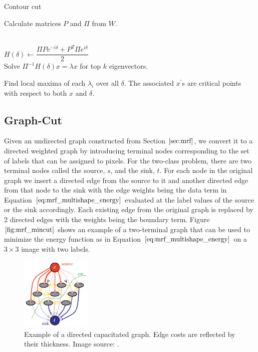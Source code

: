 \documentclass{SMBV12}
\begin{document}
\begin{algorithm}
\caption{Contour cut}
Calculate matrices $P$ and $\Pi$ from $W$.
\begin{algorithmic}
\\
\qquad $H(\delta) \leftarrow \dfrac{\Pi P e^{-i\delta} + P^T \Pi e^{i\delta}}{2}$\\
\qquad Solve $\Pi^{-1} H(\delta)x = \lambda x$ for top $k$ eigenvectors.
\EndFor
\end{algorithmic}
Find local maxima of each $\lambda_i$ over all $\delta$. The associated $x^\prime$s are critical points with respect to both $x$ and $\delta$.
\end{algorithm}

\subsection{Graph-Cut}
\label{sec:graph_cut}
Given an undirected graph constructed from Section $\ref{sec:mrf}$, we convert it to a directed weighted graph by introducing terminal nodes corresponding to the set of labels that can be assigned to pixels. For the two-class problem, there are two terminal nodes called the source, $s$, and the sink, $t$. For each node in the original graph we insert a directed edge from the source to it and another directed edge from that node to the sink with the edge weights being the data term in Equation $\ref{eq:mrf_multishape_energy}$ evaluated at the label values of the source or the sink accordingly. Each existing edge from the original graph is replaced by 2 directed edges with the weights being the boundary term. Figure $\ref{fig:mrf_mincut}$ shows an example of a two-terminal graph that can be used to minimize the energy function as in Equation $\ref{eq:mrf_multishape_energy}$ on a $3 \times 3$ image with two labels.

\begin{figure}[htbp]
    \centering
    \includegraphics[width=0.3\textwidth]{images/mincut.png}
    \caption{Example of a directed capacitated graph. Edge costs are reflected by their thickness. Image source: \cite{boykov2004experimental}.}
    \label{fig:mrf_mincut}
\end{figure}
\end{document}
